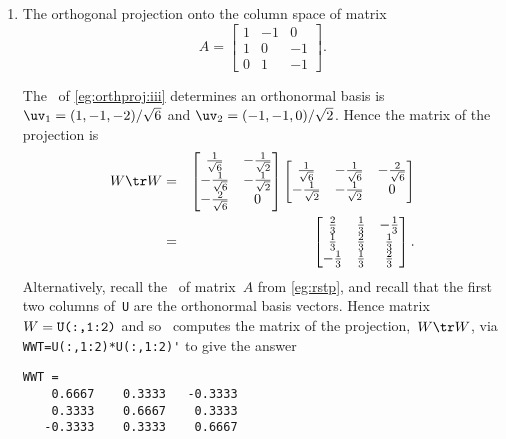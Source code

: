 \begin{example}
\begin{enumerate}
\item The orthogonal projection onto the column space of matrix
\begin{equation*}
A=\begin{bmatrix} 1&-1&0\\ 1&0&-1\\ 0&1&-1 \end{bmatrix}.
\end{equation*}
\begin{solution} 
The \svd\ of \autoref{eg:orthproj:iii} determines an orthonormal basis is \(\uv_1=(1,-1,-2)/\sqrt6\) and \(\uv_2=(-1,-1,0)/\sqrt2\).
Hence the matrix of the projection is
\begin{eqnarray*}
W\tr W&=&\begin{bmatrix} \frac1{\sqrt6}&-\frac1{\sqrt2}\\-\frac1{\sqrt6}&-\frac1{\sqrt2}\\-\frac2{\sqrt6}&0 \end{bmatrix}
\begin{bmatrix} \frac1{\sqrt6}&-\frac1{\sqrt6}&-\frac2{\sqrt6}\\ -\frac1{\sqrt2}&-\frac1{\sqrt2}&0\end{bmatrix}
\\&=&\begin{bmatrix} \frac23&\frac13&-\frac13\\\frac13&\frac23&\frac13\\-\frac13&\frac13&\frac23 \end{bmatrix}.
\end{eqnarray*}
Alternatively, recall the \svd\ of matrix~\(A\) from \autoref{eg:rstp}, and recall that the first two columns of~\verb|U| are the orthonormal basis vectors.  
Hence matrix \(W=\verb|U(:,1:2)|\) and so \script\ computes the matrix of the projection,~\(W\tr W\), via \verb|WWT=U(:,1:2)*U(:,1:2)'| to give the answer
\setbox\ajrqrbox\hbox{}%
\marginpar{\usebox{\ajrqrbox\\[2ex]}}%
\begin{verbatim}
WWT =
    0.6667    0.3333   -0.3333
    0.3333    0.6667    0.3333
   -0.3333    0.3333    0.6667
\end{verbatim}
\end{solution}



\end{enumerate}
\end{example}
